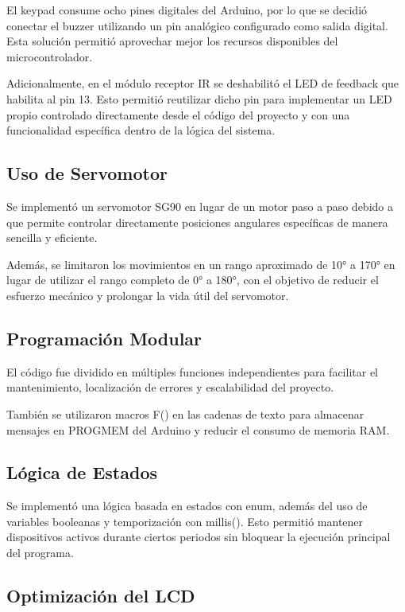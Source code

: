\documentclass[conference]{IEEEtran}
\begin{document}
El keypad consume ocho pines digitales del Arduino, por lo que se decidió conectar el buzzer utilizando 
un pin analógico configurado como salida digital. Esta solución permitió aprovechar mejor los recursos 
disponibles del microcontrolador.

Adicionalmente, en el módulo receptor IR se deshabilitó el LED de feedback que habilita al 
pin 13. Esto permitió reutilizar dicho pin para implementar un LED propio controlado directamente desde 
el código del proyecto y con una funcionalidad específica dentro de la lógica del sistema.

\subsection{Uso de Servomotor}

Se implementó un servomotor SG90 en lugar de un motor paso a paso debido a que permite controlar 
directamente posiciones angulares específicas de manera sencilla y eficiente.

Además, se limitaron los movimientos en un rango aproximado de 10° a 170° en lugar de utilizar el rango 
completo de 0° a 180°, con el objetivo de reducir el esfuerzo mecánico y prolongar la vida útil del 
servomotor.

\subsection{Programación Modular}

El código fue dividido en múltiples funciones independientes para facilitar el mantenimiento, 
localización de errores y escalabilidad del proyecto.

También se utilizaron macros F() en las cadenas de texto para almacenar mensajes en PROGMEM
del Arduino y reducir el consumo de memoria RAM.

\subsection{Lógica de Estados}

Se implementó una lógica basada en estados con enum, además del uso de variables booleanas y temporización con millis(). 
Esto permitió mantener dispositivos activos durante ciertos periodos sin bloquear la ejecución principal
del programa.

\subsection{Optimización del LCD}
\end{document}
